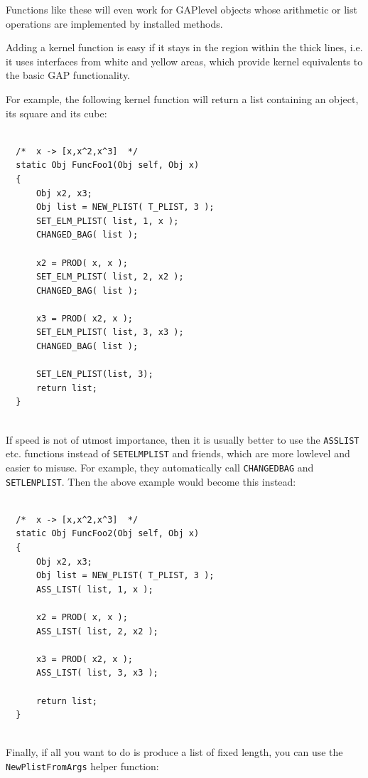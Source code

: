 \documentclass[a4paper,11pt]{report}
\begin{document}
{{ Functions like these will even work for \textsf{GAP}\texttt{}level objects whose arithmetic or list operations are
implemented by installed methods. 

 Adding a kernel function is easy if it stays in the region within the thick
lines, i.e. it uses interfaces from white and yellow areas, which provide
kernel equivalents to the basic GAP functionality. 

 For example, the following kernel function will return a list containing an
object, its square and its cube: 
\begin{Verbatim}[commandchars=!@|,fontsize=\small,frame=single,label=Example]
  
  /*  x -> [x,x^2,x^3]  */
  static Obj FuncFoo1(Obj self, Obj x)
  {
      Obj x2, x3;
      Obj list = NEW_PLIST( T_PLIST, 3 );
      SET_ELM_PLIST( list, 1, x );
      CHANGED_BAG( list );
  
      x2 = PROD( x, x );
      SET_ELM_PLIST( list, 2, x2 );
      CHANGED_BAG( list );
  
      x3 = PROD( x2, x );
      SET_ELM_PLIST( list, 3, x3 );
      CHANGED_BAG( list );
  
      SET_LEN_PLIST(list, 3);
      return list;
  }
  
\end{Verbatim}
 If speed is not of utmost importance, then it is usually better to use the \texttt{ASS{\textunderscore}LIST} etc. functions instead of \texttt{SET{\textunderscore}ELM{\textunderscore}PLIST} and friends, which are more low\texttt{}level and easier to misuse.
For example, they automatically call \texttt{CHANGED{\textunderscore}BAG} and \texttt{SET{\textunderscore}LEN{\textunderscore}PLIST}. Then the above example would become this instead: 
\begin{Verbatim}[commandchars=!@|,fontsize=\small,frame=single,label=Example]
  
  /*  x -> [x,x^2,x^3]  */
  static Obj FuncFoo2(Obj self, Obj x)
  {
      Obj x2, x3;
      Obj list = NEW_PLIST( T_PLIST, 3 );
      ASS_LIST( list, 1, x );
  
      x2 = PROD( x, x );
      ASS_LIST( list, 2, x2 );
  
      x3 = PROD( x2, x );
      ASS_LIST( list, 3, x3 );
  
      return list;
  }
  
\end{Verbatim}
 Finally, if all you want to do is produce a list of fixed length, you can use
the \texttt{NewPlistFromArgs} helper function: 
\begin{Verbatim}[commandchars=!@|,fontsize=\small,frame=single,label=Example]
  

\end{Verbatim}}}
\end{document}
